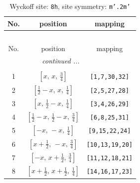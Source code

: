 \documentclass[fleqn,8pt]{jsarticle}
\begin{document}
\begin{longtable}{ccc}
\caption{Wyckoff site: {\tt 8h}, site symmetry: {\tt m'.2m'}}
 \\
 \hline \hline
No. & position & mapping \\ \hline \endfirsthead

\multicolumn{2}{l}{\tablename\ \thetable{}} \\
 \hline \hline
No. & position & mapping \\ \hline \endhead

 \hline \hline
\multicolumn{2}{r}{\footnotesize\it continued ...} \\ \endfoot

 \hline \hline
\multicolumn{2}{r}{} \\ \endlastfoot

1 & $\left[ x,\, x,\, \frac{3}{4} \right]$ & {\tt [1,7,30,32]} \\ \hline
2 & $\left[ \frac{1}{2} - x,\, x,\, \frac{1}{4} \right]$ & {\tt [2,5,27,28]} \\ \hline
3 & $\left[ x,\, \frac{1}{2} - x,\, \frac{1}{4} \right]$ & {\tt [3,4,26,29]} \\ \hline
4 & $\left[ \frac{1}{2} - x,\, \frac{1}{2} - x,\, \frac{3}{4} \right]$ & {\tt [6,8,25,31]} \\ \hline
5 & $\left[ - x,\, - x,\, \frac{1}{4} \right]$ & {\tt [9,15,22,24]} \\ \hline
6 & $\left[ x + \frac{1}{2},\, - x,\, \frac{3}{4} \right]$ & {\tt [10,13,19,20]} \\ \hline
7 & $\left[ - x,\, x + \frac{1}{2},\, \frac{3}{4} \right]$ & {\tt [11,12,18,21]} \\ \hline
8 & $\left[ x + \frac{1}{2},\, x + \frac{1}{2},\, \frac{1}{4} \right]$ & {\tt [14,16,17,23]} \\
\end{longtable}
\renewcommand{\arraystretch}{1.2}
\end{document}
